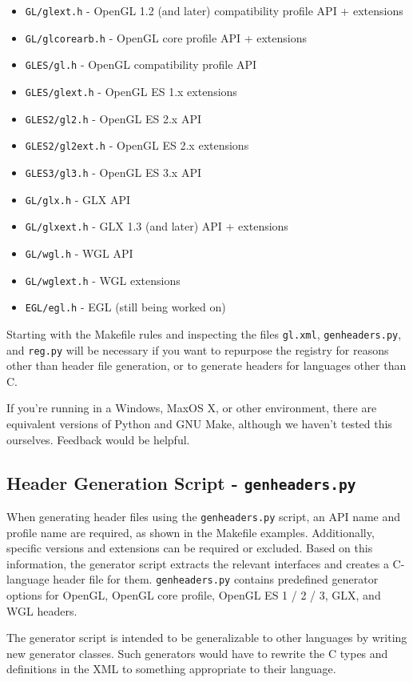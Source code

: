 \documentclass{article}
\def\code#1{{\tt #1}}
\begin{document}
\begin{itemize}
\item \code{GL/glext.h} - OpenGL 1.2 (and later) compatibility profile
      API + extensions
\item \code{GL/glcorearb.h} - OpenGL core profile API + extensions
\item \code{GLES/gl.h} - OpenGL compatibility profile API
\item \code{GLES/glext.h} - OpenGL ES 1.x extensions
\item \code{GLES2/gl2.h} - OpenGL ES 2.x API
\item \code{GLES2/gl2ext.h} - OpenGL ES 2.x extensions
\item \code{GLES3/gl3.h} - OpenGL ES 3.x API
\item \code{GL/glx.h} - GLX API
\item \code{GL/glxext.h} - GLX 1.3 (and later) API + extensions
\item \code{GL/wgl.h} - WGL API
\item \code{GL/wglext.h} - WGL extensions
\item \code{EGL/egl.h} - EGL (still being worked on)
\end{itemize}

Starting with the Makefile rules and inspecting the files \code{gl.xml},
\code{genheaders.py}, and \code{reg.py} will be necessary if you want to
repurpose the registry for reasons other than header file generation, or
to generate headers for languages other than C.

If you're running in a Windows, MaxOS X, or other environment, there are
equivalent versions of Python and GNU Make, although we haven't tested
this ourselves. Feedback would be helpful.

\subsection{Header Generation Script - \code{genheaders.py}}

When generating header files using the \code{genheaders.py} script, an
API name and profile name are required, as shown in the Makefile
examples. Additionally, specific versions and extensions can be required
or excluded. Based on this information, the generator script extracts
the relevant interfaces and creates a C-language header file for them.
\code{genheaders.py} contains predefined generator options for OpenGL,
OpenGL core profile, OpenGL ES 1 / 2 / 3, GLX, and WGL headers.

The generator script is intended to be generalizable to other languages
by writing new generator classes. Such generators would have to rewrite
the C types and definitions in the XML to something appropriate to their
language.
\end{document}
